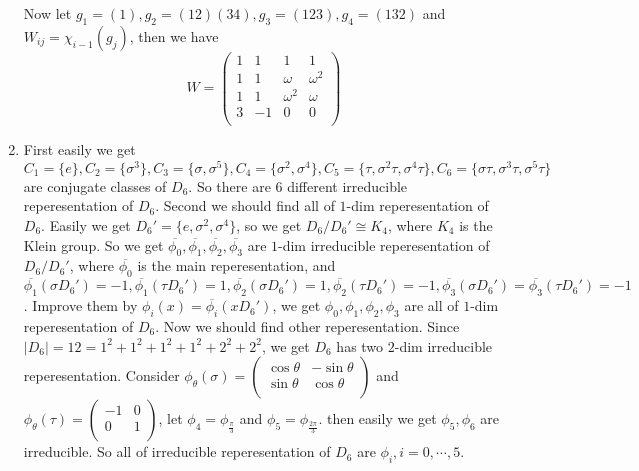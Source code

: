 \documentclass{ctexart}
\begin{document}
\begin{solution}
\begin{enumerate}
		      Now let \(g_1 = ( 1),g_2 = ( 12)( 34),g_3 = ( 123),g_4=( 132) \) and \(W_{ij}=\chi_{i-1}( g_j)\), then we have
		      \[
			      W=\begin{pmatrix}
				      1 & 1  & 1        & 1        \\
				      1 & 1  & \omega   & \omega^2 \\
				      1 & 1  & \omega^2 & \omega   \\
				      3 & -1 & 0        & 0        \\
			      \end{pmatrix}
		      \]
		\item
		      First easily we get \(C_1=\{ e\},C_2=\{ \sigma^3\},C_3=\{ \sigma,\sigma^5\},C_4=\{ \sigma^2,\sigma^4\},C_5=\{ \tau,\sigma^2 \tau,\sigma^4 \tau\},C_6=\{ \sigma \tau,\sigma^3 \tau,\sigma^5 \tau\}\) are conjugate classes of \(D_6\).
		      So there are \(6\) different irreducible reperesentation of \(D_6\).
		      Second we should find all of \(1\)-dim reperesentation of \(D_6\).
		      Easily we get \(D_6' = \{e,\sigma^2,\sigma^4 \}\), so we get \(D_6 / D_6' \cong K_4\), where \(K_4\) is the Klein group.
		      So we get \(\overline{\phi_0},\overline{\phi_1},\overline{\phi_2},\overline{\phi_3}\) are \(1\)-dim irreducible reperesentation of \(D_6 / D_6'\), where
		      \(\overline{\phi_0}\) is the main reperesentation, and \(\overline{\phi_1}( \sigma D_6')=-1,\overline{\phi_1}( \tau D_6')=1,\overline{\phi_2}( \sigma D_6')=1,\overline{\phi_2}( \tau D_6')=-1,\overline{\phi_3}( \sigma D_6')=\overline{\phi_3}( \tau D_6')=-1\).
		      Improve them by \(\phi_i( x)=\overline{\phi_i}( x D_6')\), we get \(\phi_0,\phi_1,\phi_2,\phi_3\) are all of \(1\)-dim reperesentation of \(D_6\).
		      Now we should find other reperesentation. Since \(| D_6|=12=1^2+1^2+1^2+1^2+2^2+2^2\), we get \(D_6\) has two \(2\)-dim irreducible reperesentation.
		      Consider \(\phi_\theta( \sigma)=\begin{pmatrix}
			      \cos \theta & -\sin \theta \\
			      \sin \theta & \cos \theta  \\
		      \end{pmatrix}\) and \(\phi_\theta( \tau)=\begin{pmatrix}
			      -1 & 0 \\
			      0  & 1 \\
		      \end{pmatrix}\), let \(\phi_4=\phi_{\frac{\pi}{3}}\) and \(\phi_5=\phi_{\frac{2\pi}{3}}\).
		      then easily we get \(\phi_5,\phi_6\) are irreducible. So all of irreducible reperesentation of \(D_6\) are \(\phi_i,i=0,\cdots,5\).

\end{enumerate}
\end{solution}
\end{document}
